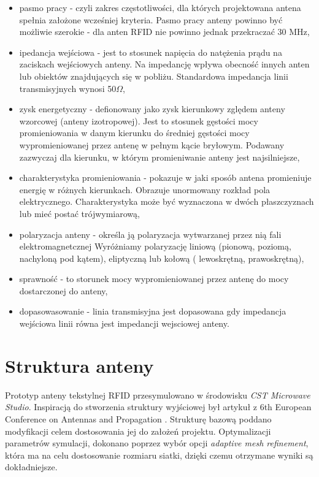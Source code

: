 \begin{itemize}\setlength{\itemsep}{0pt}

	\item pasmo pracy - czyli zakres częstotliwości, dla których projektowana antena spełnia założone wcześniej kryteria. Pasmo pracy anteny powinno być możliwie szerokie - dla anten RFID nie powinno jednak przekraczać 30 MHz,

	\item ipedancja wejściowa - jest to stosunek napięcia do natężenia prądu na zaciskach wejściowych anteny. Na impedancję wpływa obecność innych anten lub obiektów znajdujących się w pobliżu.
	Standardowa impedancja linii transmisyjnych wynosi 50\(\Omega\),

	\item zysk energetyczny - defionowany jako zysk kierunkowy zględem anteny wzorcowej (anteny izotropowej).
	Jest to stosunek gęstości mocy promieniowania w danym kierunku do średniej gęstości mocy wypromieniowanej przez antenę w pełnym kącie bryłowym. Podawany zazwyczaj dla kierunku, w którym promieniwanie anteny jest najsilniejsze, 

	\item charakterystyka promieniowania - pokazuje w jaki sposób antena promieniuje energię w różnych kierunkach. Obrazuje unormowany rozkład pola elektrycznego. Charakterystyka może być wyznaczona w dwóch płaszczyznach lub mieć postać trójwymiarową,

	\item polaryzacja anteny - określa ją polaryzacja wytwarzanej przez nią fali elektromagnetcznej 
	Wyróżniamy polaryzację liniową (pionową, poziomą, nachyloną pod kątem), eliptyczną lub kołową ( lewoskrętną, prawoskrętną),

	\item sprawność - to storunek mocy wypromieniowanej przez antenę do mocy dostarczonej do anteny,

	\item dopasowasowanie - linia transmisyjna jest dopasowana gdy impedancja wejściowa linii równa jest impedancji wejsciowej anteny. 

\end{itemize}

\newpage
\section{Struktura anteny}

Prototyp anteny tekstylnej RFID przesymulowano w środowisku \emph{CST Microwave Studio}. Inspiracją do stworzenia struktury wyjściowej był artykuł z 6th European Conference on Antennas and Propagation \cite{Artykul}. Strukturę bazową poddano modyfikacji celem dostosowania jej do założeń projektu. Optymalizacji parametrów symulacji, dokonano poprzez wybór opcji \emph{adaptive mesh refinement}, która ma na celu dostosowanie rozmiaru siatki, dzięki czemu otrzymane wyniki są dokładniejsze.


